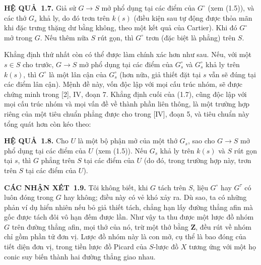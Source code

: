 \documentclass[11pt,twoside,openany]{book}
\numberwithin{equation}{section}
\newcommand{\result}[2]{\par\medskip\noindent\textbf{#1\if\relax\detokenize{#2}\relax\else\ #2\fi.}\quad}
\begin{document}
\result{HỆ QUẢ}{1.7} Giả sử $G\longrightarrow S$ mở phổ dụng tại các điểm của
$G^\circ$ (xem (1.5)), và các thớ $G_s$ khả ly, do đó trơn trên $k(s)$ (điều
kiện sau tự động được thỏa mãn khi đặc trưng thặng dư bằng không, theo một kết
quả của Cartier). Khi đó $G^\circ$ mở trong $G$. Nếu thêm nữa $S$ rút gọn, thì
$G^\circ$ trơn (đặc biệt là phẳng) trên $S$.

Khẳng định thứ nhất còn có thể được làm chính xác hơn như sau. Nếu, với một
$s\in S$ cho trước, $G\longrightarrow S$ mở phổ dụng tại các điểm của
$G_s^\circ$ và $G_s^\circ$ khả ly trên $k(s)$, thì $G^\circ$ là một lân cận
của $G_s^\circ$ (hơn nữa, giả thiết đặt tại $s$ vẫn sẽ đúng tại các điểm lân
cận). Mệnh đề này, vốn độc lập với mọi cấu trúc nhóm, sẽ được chứng minh trong
[2], IV, đoạn 7. Khẳng định cuối của (1.7), cũng độc lập với mọi cấu trúc nhóm
và mọi vấn đề về thành phần liên thông, là một trường hợp riêng của một tiêu
chuẩn phẳng được cho trong [IV], đoạn 5, và tiêu chuẩn này tổng quát hơn còn
kéo theo:

\result{HỆ QUẢ}{1.8} Cho $U$ là một bộ phận mở của một thớ $G_s$, sao cho
$G\longrightarrow S$ mở phổ dụng tại các điểm của $U$ (xem (1.5)). Nếu $G_s$
khả ly trên $k(s)$ và $S$ rút gọn tại $s$, thì $G$ phẳng trên $S$ tại các điểm
của $U$ (do đó, trong trường hợp này, trơn trên $S$ tại các điểm của $U$).

\result{CÁC NHẬN XÉT}{1.9} Tôi không biết, khi $G$ tách trên $S$, liệu
$G^\circ$ hay $G^\tau$ có luôn đóng trong $G$ hay không; điều này có vẻ khó xảy
ra. Dù sao, ta có những phản ví dụ hiển nhiên nếu bỏ giả thiết tách, chẳng hạn
lấy đường thẳng afin mà gốc được tách đôi vô hạn đếm được lần. Như vậy ta thu
được một lược đồ nhóm $G$ trên đường thẳng afin, mọi thớ của nó, trừ một thớ
bằng $\mathbf Z$, đều rút về nhóm chỉ gồm phần tử đơn vị. Lược đồ nhóm này là
con mở, cụ thể là bao đóng của tiết diện đơn vị, trong tiền lược đồ Picard của
$S$-lược đồ $X$ tương ứng với một họ conic suy biến thành hai đường thẳng giao
nhau.
\end{document}
